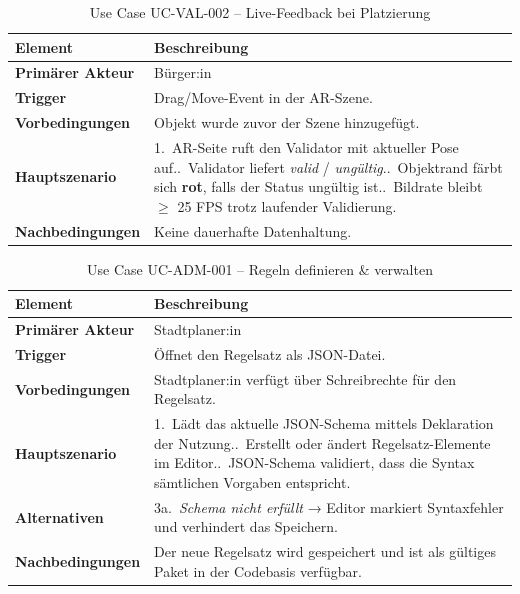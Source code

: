 \begin{table}[h]
\centering
\begin{tabular}{| p{4cm} | p{11cm} |}
\hline
\textbf{Element} & \textbf{Beschreibung} \\
\hline\hline
\textbf{Primärer Akteur} & Bürger:in \\
\hline
\textbf{Trigger} & Drag/Move-Event in der AR-Szene. \\
\hline
\textbf{Vorbedingungen} & Objekt wurde zuvor der Szene hinzugefügt. \\
\hline
\textbf{Hauptszenario} & 1.\ AR-Seite ruft den Validator mit aktueller Pose auf.\newline
2.\ Validator liefert \textit{valid} / \textit{ungültig}.\newline
3.\ Objektrand färbt sich \textbf{rot}, falls der Status ungültig ist.\newline
4.\ Bildrate bleibt $\geq$ 25 FPS trotz laufender Validierung. \\
\hline
\textbf{Nachbedingungen} & Keine dauerhafte Datenhaltung. \\
\hline
\end{tabular}
\caption{Use Case UC-VAL-002 – Live-Feedback bei Platzierung}
\label{tab:UC-VAL-002}
\end{table}

\FloatBarrier


\begin{table}[h]
\centering
\begin{tabular}{| p{4cm} | p{11cm} |}
\hline
\textbf{Element} & \textbf{Beschreibung} \\
\hline\hline
\textbf{Primärer Akteur} & Stadtplaner:in \\
\hline
\textbf{Trigger} & Öffnet den Regelsatz als JSON-Datei. \\
\hline
\textbf{Vorbedingungen} & Stadtplaner:in verfügt über Schreibrechte für den Regelsatz. \\
\hline
\textbf{Hauptszenario} & 1.\ Lädt das aktuelle JSON-Schema mittels Deklaration der Nutzung.\newline
2.\ Erstellt oder ändert Regelsatz-Elemente im Editor.\newline
3.\ JSON-Schema validiert, dass die Syntax sämtlichen Vorgaben entspricht. \\
\hline
\textbf{Alternativen} & 3a.\ \textit{Schema nicht erfüllt} → Editor markiert Syntaxfehler und verhindert das Speichern. \\
\hline
\textbf{Nachbedingungen} & Der neue Regelsatz wird gespeichert und ist als gültiges Paket in der Codebasis verfügbar. \\
\hline
\end{tabular}
\caption{Use Case UC-ADM-001 – Regeln definieren \& verwalten}
\label{tab:UC-ADM-001}
\end{table}

